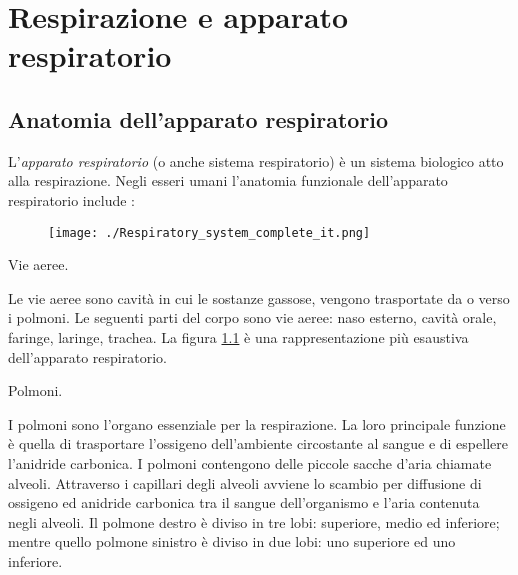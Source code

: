 \chapter{Respirazione e apparato respiratorio}
\label{capitolo:preliminari:respirazione}

\section{Anatomia dell'apparato respiratorio}

L'\emph{apparato respiratorio} (o anche sistema respiratorio) \`e un sistema biologico atto alla respirazione. Negli esseri umani l'anatomia funzionale dell'apparato respiratorio include \cite{anatomiaRespiratorio}:

\begin{figure}
 \centering
 \texttt{[image: ./Respiratory\_system\_complete\_it.png]}
  \label{apparatoRespiratorio}
\end{figure}



\begin{bf}Vie aeree.\end{bf}
    Le vie aeree sono cavit\`a in cui le sostanze gassose, vengono trasportate da o verso i polmoni. Le seguenti parti del corpo sono vie aeree: naso esterno, cavit\`a orale, faringe, laringe, trachea. La figura \ref{apparatoRespiratorio} \cite{appaRespi} \`e una rappresentazione pi\`u esaustiva dell'apparato respiratorio.


\begin{bf}Polmoni.\end{bf}
    I polmoni sono l'organo essenziale per la respirazione. 
    La loro principale funzione \`e quella di trasportare l'ossigeno dell'ambiente circostante al sangue e di espellere l'anidride carbonica. 
    I polmoni contengono delle piccole sacche d'aria chiamate alveoli. 
    Attraverso i capillari degli alveoli avviene lo scambio per diffusione di ossigeno ed anidride carbonica tra il sangue dell'organismo e l'aria contenuta negli alveoli. 
    Il polmone destro \`e diviso in tre lobi: superiore, medio ed inferiore; mentre quello polmone sinistro \`e diviso in due lobi: uno superiore ed uno inferiore. 


